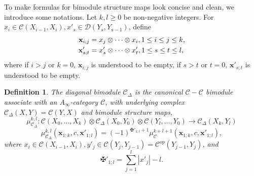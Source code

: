 \documentclass[11pt]{amsproc}
\def\cc{\mathcal{C}}
\def\dd{\mathcal{D}}
\def\D{\Delta}
\def\ainf{A_\infty}
\newtheorem{defn}[lem]{Definition}
\theoremstyle{remark}
\numberwithin{equation}{section}
\begin{document}
To make formulas for bimodule structure maps look concise and clean, we introduce some notations.
Let $k, l \ge 0$ be non-negative integers.
For $x_{i} \in \cc(X_{i-1}, X_{i}), x'_{s} \in \dd(Y_{s}, Y_{s-1})$, 
define
\begin{align}
\mathbf{x}_{i; j} & = x_{j} \otimes \cdots \otimes x_{i}, \vspace{0.5cm} 1 \le i \le j \le k, \label{tensor symbol 1} \\
\mathbf{x}'_{s; t} & = x'_{s} \otimes \cdots \otimes x'_{t}, \vspace{0.5cm} 1 \le s \le t \le l, \label{tensor symbol 2}
\end{align}
where if $i > j$ or $k=0$, $\mathbf{x}_{i; j}$ is understood to be empty,
if $s>t$ or $t=0$, $\mathbf{x}'_{s; t}$ is understood to be empty.

\begin{defn}\label{def: diagonal bimodule}
The {\it diagonal bimodule} $\cc_{\D}$ is the canonical $\cc-\cc$ bimodule associate with an $\ainf$-category $\cc$,
with underlying complex $\cc_{\D}(X, Y) = \cc(Y, X)$ and bimodule structure maps,
\begin{equation}
\mu^{k, l}_{\cc_{\D}}: \cc(X_{0}, \ldots, X_{k}) \otimes \cc_{\D}(X_{0}, Y_{0}) \otimes \cc(Y_{l}, \ldots, Y_{0}) \to \cc_{\D}(X_{k}, Y_{l})
\end{equation}
\begin{equation}\label{structure maps for diagonal}
\mu^{k, l}_{\cc_{\D}}(\mathbf{x}_{1;k}, c, \mathbf{x}'_{1;l}) = (-1)^{\maltese'_{1;l}+1} \mu_{\cc}^{k+l+1}(\mathbf{x}_{1;k}, c, \mathbf{x}'_{1;l}),
\end{equation}
where $x_{i} \in \cc(X_{i-1}, X_{i}), y'_{j} \in \cc(Y_{j}, Y_{j-1}) = \cc^{op}(Y_{j-1}, Y_{j})$, and 
\begin{equation}
\maltese'_{1;l} = \sum_{j=1}^{l} |x'_{j}| - l.
\end{equation}
\end{defn}
\end{document}
